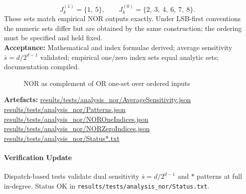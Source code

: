 \documentclass{article}
\begin{document}
\[
J_k^{(1)} = \{1,\ 5\},\qquad J_k^{(0)} = \{2,\ 3,\ 4,\ 6,\ 7,\ 8\}.
\]
These sets match empirical NOR outputs exactly. Under LSB-first conventions the numeric sets differ but are obtained by the same construction; the ordering must be specified and held fixed.\\
\textbf{Acceptance:} Mathematical and index formulae derived; average sensitivity \(\bar{s}=d/2^{d-1}\) validated; empirical one/zero index sets equal analytic sets; documentation compiled.\\
\begin{figure}[h]
\centering
{}
\caption{NOR as complement of OR one-set over ordered inputs}
\end{figure}
\textbf{Artefacts:} \url{results/tests/analysis_nor/AverageSensitivity.json}\\
\url{results/tests/analysis_nor/Patterns.json}\\
\url{results/tests/analysis_nor/NOROneIndices.json}\\
\url{results/tests/analysis_nor/NORZeroIndices.json}\\
\url{results/tests/analysis_nor/Status*.txt}
\paragraph{Verification Update} Dispatch-based tests validate dual sensitivity \(\bar{s}=d/2^{d-1}\) and \(*\) patterns at full in-degree. Status OK in \texttt{results/tests/analysis\_nor/Status.txt}.
\end{document}
